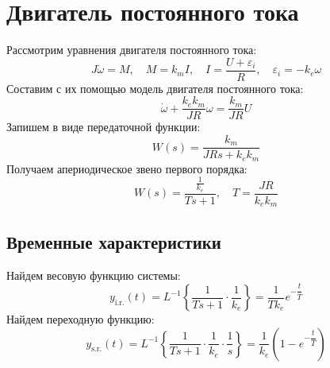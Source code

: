 \section{Двигатель постоянного тока}
Рассмотрим уравнения двигателя постоянного тока:
\begin{equation}
    J\dot{\omega} = M,\quad M = k_mI,\quad I=\frac{U + \varepsilon_i}{R},\quad\varepsilon_i = -k_e\omega
\end{equation}
Составим с их помощью модель двигателя постоянного тока:
\begin{equation}
    \dot{\omega} + \frac{k_ek_m}{JR}\omega = \frac{k_m}{JR} U
    \label{eq:dc_motor_deq}
\end{equation}
Запишем в виде передаточной функции:
\begin{equation}
    W(s) = \frac{k_m}{JRs + k_ek_m}
    \label{eq:dc_motor_tf}
\end{equation}
Получаем апериодическое звено первого порядка:
\begin{equation}
    W(s) = \frac{\frac{1}{k_e}}{Ts + 1}, \quad T = \frac{JR}{k_ek_m}
\end{equation}
\subsection{Временные характеристики}
\noindent Найдем весовую функцию системы:
\begin{equation}
    y_{\text{i.r.}}(t) = L^{-1}\left\{\frac{1}{Ts + 1}\cdot\frac{1}{k_e}\right\} = \frac{1}{Tk_e}e^{-\dfrac{t}{T}} 
\end{equation}
Найдем переходную функцию:
\begin{equation}
    y_{\text{s.r.}}(t) = L^{-1}\left\{\frac{1}{Ts + 1}\cdot\frac{1}{k_e}\cdot\frac{1}{s}\right\} = \frac{1}{k_e} \left(1 - e^{-\dfrac{t}{T}}\right)
\end{equation}

